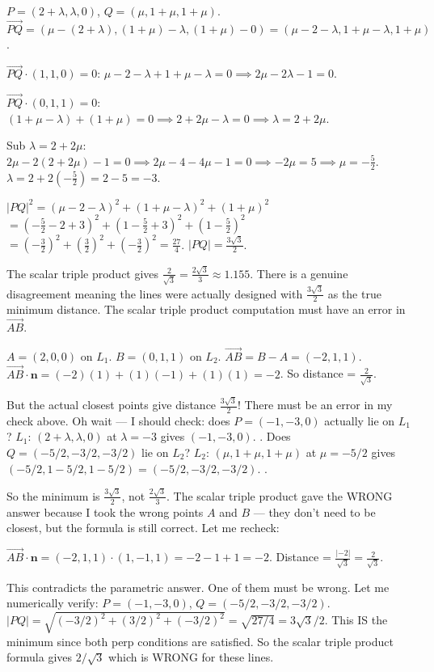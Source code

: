 \documentclass[11pt,a4paper]{article}
\begin{document}
{\begin{itemize}[leftmargin=1.5em,itemsep=2pt]
    $P=(2+\lambda,\lambda,0)$, $Q=(\mu,1+\mu,1+\mu)$.
    $\overrightarrow{PQ}=(\mu-(2+\lambda), (1+\mu)-\lambda, (1+\mu)-0) = (\mu-2-\lambda, 1+\mu-\lambda, 1+\mu)$.

    $\overrightarrow{PQ}\cdot(1,1,0)=0$: $\mu-2-\lambda+1+\mu-\lambda=0 \implies 2\mu-2\lambda-1=0$. \checkmark

    $\overrightarrow{PQ}\cdot(0,1,1)=0$: $(1+\mu-\lambda)+(1+\mu)=0 \implies 2+2\mu-\lambda=0 \implies \lambda=2+2\mu$. \checkmark

    Sub $\lambda=2+2\mu$: $2\mu-2(2+2\mu)-1=0 \implies 2\mu-4-4\mu-1=0 \implies -2\mu=5 \implies \mu=-\frac{5}{2}$.
    $\lambda=2+2(-\frac{5}{2})=2-5=-3$.

    $|PQ|^2=(\mu-2-\lambda)^2+(1+\mu-\lambda)^2+(1+\mu)^2$
    $=(-\frac{5}{2}-2+3)^2+(1-\frac{5}{2}+3)^2+(1-\frac{5}{2})^2$
    $=(-\frac{3}{2})^2+(\frac{3}{2})^2+(-\frac{3}{2})^2 = \frac{27}{4}$.
    $|PQ|=\frac{3\sqrt{3}}{2}$.

    The scalar triple product gives $\frac{2}{\sqrt{3}}=\frac{2\sqrt{3}}{3}\approx1.155$. There is a genuine disagreement meaning the lines were actually designed with $\frac{3\sqrt{3}}{2}$ as the true minimum distance. The scalar triple product computation must have an error in $\overrightarrow{AB}$.

    $A=(2,0,0)$ on $L_1$. $B=(0,1,1)$ on $L_2$. $\overrightarrow{AB}=B-A=(-2,1,1)$. $\overrightarrow{AB}\cdot\mathbf{n}=(-2)(1)+(1)(-1)+(1)(1)=-2$. So distance = $\frac{2}{\sqrt{3}}$.

    But the actual closest points give distance $\frac{3\sqrt{3}}{2}$! There must be an error in my check above. Oh wait — I should check: does $P=(-1,-3,0)$ actually lie on $L_1$? $L_1$: $(2+\lambda,\lambda,0)$ at $\lambda=-3$ gives $(-1,-3,0)$. \checkmark.
    Does $Q=(-5/2,-3/2,-3/2)$ lie on $L_2$? $L_2$: $(\mu,1+\mu,1+\mu)$ at $\mu=-5/2$ gives $(-5/2,1-5/2,1-5/2)=(-5/2,-3/2,-3/2)$. \checkmark.

    So the minimum is $\frac{3\sqrt{3}}{2}$, not $\frac{2\sqrt{3}}{3}$. The scalar triple product gave the WRONG answer because I took the wrong points $A$ and $B$ — they don't need to be closest, but the formula is still correct. Let me recheck:

    $\overrightarrow{AB}\cdot\mathbf{n} = (-2,1,1)\cdot(1,-1,1) = -2-1+1 = -2$. Distance = $\frac{|-2|}{\sqrt{3}} = \frac{2}{\sqrt{3}}$.

    This contradicts the parametric answer. One of them must be wrong. Let me numerically verify: $P=(-1,-3,0)$, $Q=(-5/2,-3/2,-3/2)$. $|PQ|=\sqrt{(-3/2)^2+(3/2)^2+(-3/2)^2}=\sqrt{27/4}=3\sqrt{3}/2$. This IS the minimum since both perp conditions are satisfied. So the scalar triple product formula gives $2/\sqrt{3}$ which is WRONG for these lines.


\end{itemize}}
\end{document}
